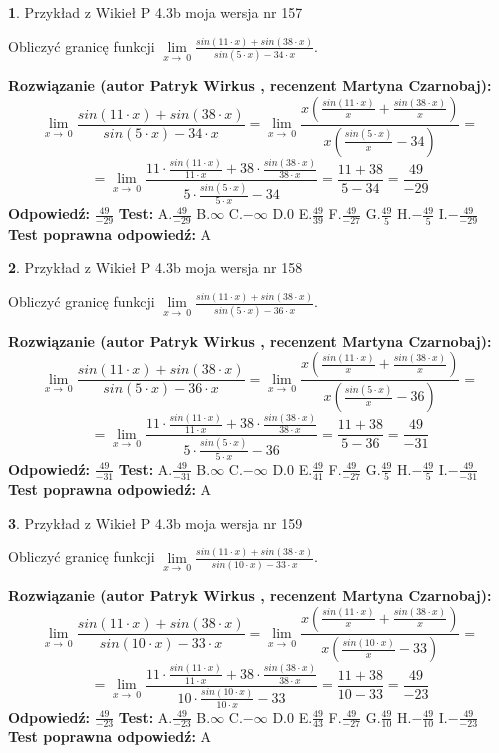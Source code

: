 \documentclass[12pt, a4paper]{article}
\theoremstyle{definition} %
\newtheorem{zad}{}
\newcommand{\zadStart}[1]{\begin{zad}#1\newline}
\newcommand{\zadStop}{\end{zad}}
\newcommand{\rozwStart}[2]{\noindent \textbf{Rozwiązanie (autor #1 , recenzent #2): }\newline}
\newcommand{\rozwStop}{\newline}
\newcommand{\odpStart}{\noindent \textbf{Odpowiedź:}\newline}
\newcommand{\odpStop}{\newline}
\newcommand{\testStart}{\noindent \textbf{Test:}\newline}
\newcommand{\testStop}{\newline}
\newcommand{\kluczStart}{\noindent \textbf{Test poprawna odpowiedź:}\newline}
\newcommand{\kluczStop}{\newline}
\begin{document}
\zadStart{Przykład z Wikieł P 4.3b moja wersja nr 157}


Obliczyć granicę funkcji $\lim\limits_{x\to\ 0}\frac{sin(11 \cdot x)+sin(38 \cdot x)}{sin(5 \cdot x)-34 \cdot x}$.
\zadStop
\rozwStart{Patryk Wirkus}{Martyna Czarnobaj}
$$\lim\limits_{x\to\ 0}\frac{sin(11 \cdot x)+sin(38 \cdot x)}{sin(5 \cdot x)-34 \cdot x}=\lim\limits_{x\to\ 0}\frac{x(\frac{sin(11 \cdot x)}{x}+\frac{sin(38 \cdot x)}{x})}{x(\frac{sin(5 \cdot x)}{x}-34)}=$$
$$=\lim\limits_{x\to\ 0}\frac{11 \cdot \frac{sin(11 \cdot x)}{11 \cdot x}+38 \cdot \frac{sin(38 \cdot x)}{38 \cdot x}}{5 \cdot \frac{sin(5 \cdot x)}{5 \cdot x}-34}=\frac{11+38}{5-34} = \frac{49}{-29}$$
\rozwStop
\odpStart
$\frac{49}{-29}$
\odpStop
\testStart
A.$\frac{49}{-29}$
B.$\infty$
C.$-\infty$
D.$0$
E.$\frac{49}{39}$
F.$\frac{49}{-27}$
G.$\frac{49}{5}$
H.$-\frac{49}{5}$
I.$-\frac{49}{-29}$
\testStop
\kluczStart
A
\kluczStop



\zadStart{Przykład z Wikieł P 4.3b moja wersja nr 158}


Obliczyć granicę funkcji $\lim\limits_{x\to\ 0}\frac{sin(11 \cdot x)+sin(38 \cdot x)}{sin(5 \cdot x)-36 \cdot x}$.
\zadStop
\rozwStart{Patryk Wirkus}{Martyna Czarnobaj}
$$\lim\limits_{x\to\ 0}\frac{sin(11 \cdot x)+sin(38 \cdot x)}{sin(5 \cdot x)-36 \cdot x}=\lim\limits_{x\to\ 0}\frac{x(\frac{sin(11 \cdot x)}{x}+\frac{sin(38 \cdot x)}{x})}{x(\frac{sin(5 \cdot x)}{x}-36)}=$$
$$=\lim\limits_{x\to\ 0}\frac{11 \cdot \frac{sin(11 \cdot x)}{11 \cdot x}+38 \cdot \frac{sin(38 \cdot x)}{38 \cdot x}}{5 \cdot \frac{sin(5 \cdot x)}{5 \cdot x}-36}=\frac{11+38}{5-36} = \frac{49}{-31}$$
\rozwStop
\odpStart
$\frac{49}{-31}$
\odpStop
\testStart
A.$\frac{49}{-31}$
B.$\infty$
C.$-\infty$
D.$0$
E.$\frac{49}{41}$
F.$\frac{49}{-27}$
G.$\frac{49}{5}$
H.$-\frac{49}{5}$
I.$-\frac{49}{-31}$
\testStop
\kluczStart
A
\kluczStop



\zadStart{Przykład z Wikieł P 4.3b moja wersja nr 159}


Obliczyć granicę funkcji $\lim\limits_{x\to\ 0}\frac{sin(11 \cdot x)+sin(38 \cdot x)}{sin(10 \cdot x)-33 \cdot x}$.
\zadStop
\rozwStart{Patryk Wirkus}{Martyna Czarnobaj}
$$\lim\limits_{x\to\ 0}\frac{sin(11 \cdot x)+sin(38 \cdot x)}{sin(10 \cdot x)-33 \cdot x}=\lim\limits_{x\to\ 0}\frac{x(\frac{sin(11 \cdot x)}{x}+\frac{sin(38 \cdot x)}{x})}{x(\frac{sin(10 \cdot x)}{x}-33)}=$$
$$=\lim\limits_{x\to\ 0}\frac{11 \cdot \frac{sin(11 \cdot x)}{11 \cdot x}+38 \cdot \frac{sin(38 \cdot x)}{38 \cdot x}}{10 \cdot \frac{sin(10 \cdot x)}{10 \cdot x}-33}=\frac{11+38}{10-33} = \frac{49}{-23}$$
\rozwStop
\odpStart
$\frac{49}{-23}$
\odpStop
\testStart
A.$\frac{49}{-23}$
B.$\infty$
C.$-\infty$
D.$0$
E.$\frac{49}{43}$
F.$\frac{49}{-27}$
G.$\frac{49}{10}$
H.$-\frac{49}{10}$
I.$-\frac{49}{-23}$
\testStop
\kluczStart
A
\kluczStop
\end{document}
